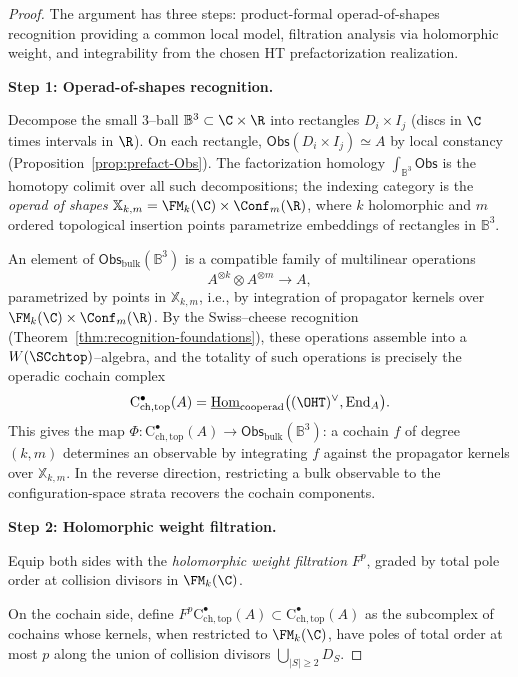 \begin{proof}
The argument has three steps: product-formal operad-of-shapes
recognition providing a common local model, filtration analysis via
holomorphic weight, and integrability from the chosen HT
prefactorization realization.

\medskip
\textbf{Step 1: Operad-of-shapes recognition.}

Decompose the small $3$--ball $\mathbb{B}^3 \subset \C \times \R$ into rectangles $D_i \times I_j$ (discs in $\C$ times intervals in $\R$). On each rectangle, $\mathsf{Obs}(D_i \times I_j) \simeq A$ by local constancy (Proposition~\ref{prop:prefact-Obs}). The factorization homology $\int_{\mathbb{B}^3} \mathsf{Obs}$ is the homotopy colimit over all such decompositions; the indexing category is the \emph{operad of shapes} $\mathbb{X}_{k,m} = \FM_k(\C) \times \Conf_m(\R)$, where $k$ holomorphic and $m$ ordered topological insertion points parametrize embeddings of rectangles in $\mathbb{B}^3$.

An element of $\mathsf{Obs}_{\mathrm{bulk}}(\mathbb{B}^3)$ is a compatible family of multilinear operations
\[
A^{\otimes k} \otimes A^{\otimes m} \longrightarrow A,
\]
parametrized by points in $\mathbb{X}_{k,m}$, i.e., by integration of propagator kernels over $\FM_k(\C) \times \Conf_m(\R)$. By the Swiss--cheese recognition (Theorem~\ref{thm:recognition-foundations}), these operations assemble into a $W(\SCchtop)$--algebra, and the totality of such operations is precisely the operadic cochain complex
\[
\mathrm{C}^\bullet_{\mathrm{ch,top}}(A) = \underline{\mathrm{Hom}}_{\text{cooperad}}\bigl((\OHT)^\vee, \mathrm{End}_A\bigr).
\]
This gives the map $\Phi \colon \mathrm{C}^\bullet_{\mathrm{ch,top}}(A) \to \mathsf{Obs}_{\mathrm{bulk}}(\mathbb{B}^3)$: a cochain $f$ of degree $(k,m)$ determines an observable by integrating $f$ against the propagator kernels over $\mathbb{X}_{k,m}$. In the reverse direction, restricting a bulk observable to the configuration-space strata recovers the cochain components.

\medskip
\textbf{Step 2: Holomorphic weight filtration.}

Equip both sides with the \emph{holomorphic weight filtration} $F^p$, graded by total pole order at collision divisors in $\FM_k(\C)$.

On the cochain side, define $F^p \mathrm{C}^\bullet_{\mathrm{ch,top}}(A) \subset \mathrm{C}^\bullet_{\mathrm{ch,top}}(A)$ as the subcomplex of cochains whose kernels, when restricted to $\FM_k(\C)$, have poles of total order at most $p$ along the union of collision divisors $\bigcup_{|S| \geq 2} D_S$.


\end{proof}
